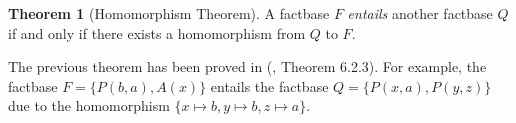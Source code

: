 \documentclass{article}
\theoremstyle{definition}
\newtheorem{theorem}{Theorem}[section]
\theoremstyle{remark}
\newcommand{\Terms}{\textbf{Terms}}
\begin{document}
\begin{theorem}[Homomorphism Theorem] \label{hom_thm}
A factbase $F$ \emph{entails} another factbase $Q$ if and only if there exists a homomorphism from $Q$ to $F$.
\end{theorem}

The previous theorem has been proved in (\cite{base}, Theorem 6.2.3). For example, the factbase $F = \{P(b,a),A(x)\}$ entails the factbase $Q = \{P(x,a),P(y,z)\}$ due to the homomorphism $\{x \mapsto b, y \mapsto b, z \mapsto a \}$.





\end{document}
